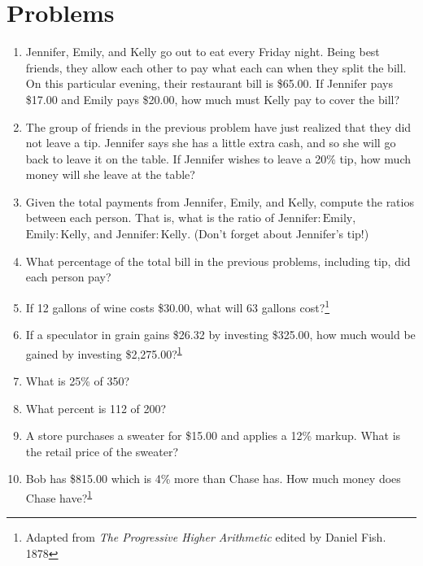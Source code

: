 \documentclass{article}
\begin{document}
\section*{Problems}
\begin{enumerate}
\item Jennifer, Emily, and Kelly go out to eat every Friday night.  Being best friends, they allow each other to pay what 
each can when they split the bill.  On this particular evening, 
their restaurant bill is \$65.00.  If Jennifer pays \$17.00 and Emily pays \$20.00, how much must Kelly pay to cover the bill?

\item The group of friends in the previous problem have just realized that they did not leave a tip.  Jennifer says she has a little extra cash, and so she will go back to leave it on the table.  If Jennifer wishes to leave a 20\% tip, how much money 
will she leave at the table?

\item Given the total payments from Jennifer, Emily, and Kelly, compute the ratios between each person.  That is, what is the ratio of $\mathrm{Jennifer} : \mathrm{Emily}$, $\mathrm{Emily}:\mathrm{Kelly}$, and $\mathrm{Jennifer}:\mathrm{Kelly}$.  
(Don't forget about Jennifer's tip!)

\item What percentage of the total bill in the previous problems, including tip, did each person pay?

\item If 12 gallons of wine costs \$30.00, what will 63 gallons cost?\footnote{Adapted from {\em The Progressive Higher Arithmetic} edited by Daniel Fish. 1878\label{fn:higher}}

\item If a speculator in grain gains \$26.32 by investing 
\$325.00, how much would be gained by investing
\$2,275.00?\textsuperscript{\ref{fn:higher}}

\item What is 25\% of 350?

\item What percent is 112 of 200?

\item A store purchases a sweater for \$15.00 and applies a 12\% markup.  What is the retail price of the sweater?

\item Bob has \$815.00 which is 4\% more than Chase has.  How much
money does Chase have?\textsuperscript{\ref{fn:higher}}


\end{enumerate}
\end{document}

